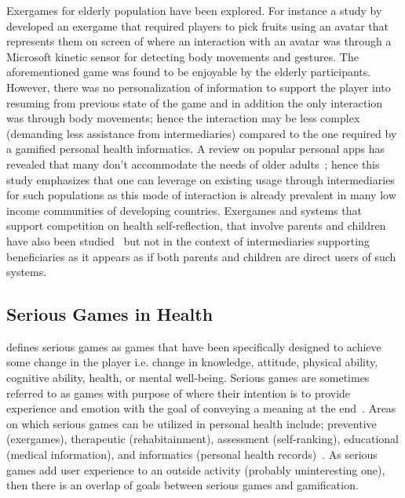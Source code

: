 Exergames for elderly population have been explored. For instance a study by \cite{brauner2013increase} developed an exergame that required players to pick fruits using an avatar that represents them on screen of where an interaction with an avatar was through a Microsoft kinetic sensor for detecting body movements and gestures. The aforementioned game was found to be enjoyable by the elderly participants. However, there was no personalization of information to support the player into resuming from previous state of the game and in addition the only interaction was through body movements; hence the interaction may be less complex (demanding less assistance from intermediaries) compared to the one required by a gamified personal health informatics. A review on popular personal apps has revealed that many don't accommodate the needs of older adults~\citep{silva2014:smartphones}; hence this study emphasizes that one can leverage on existing usage through intermediaries for such populations as this mode of interaction is already prevalent in many low income communities of developing countries. Exergames and systems that support competition on health self-reflection, that involve  parents and children have also been studied~\citep{grimes2009toward,saksono2015spaceship} but not in the context of intermediaries supporting beneficiaries as it appears as if both parents and children are direct users of such systems. 

\subsection{Serious Games in Health}
\cite{mccallum2012gamification} defines serious games as games that have been specifically designed to achieve some change in the player i.e. change in knowledge, attitude, physical ability, cognitive ability, health, or mental well-being. Serious games are sometimes referred to as games with purpose of  where their intention is to provide experience and emotion with the goal of conveying a meaning at the end~\citep{marsh2011serious}. Areas on which serious games can be utilized in personal health include; preventive (exergames), therapeutic (rehabitainment), assessment (self-ranking), educational (medical information), and informatics (personal health records)~\citep{mccallum2012gamification}. As serious games add user experience to an outside activity (probably uninteresting one), then there is an overlap of goals between serious games and gamification. 

